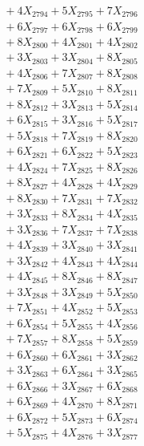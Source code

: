 \documentclass[a4paper,10pt]{article}
\begin{document}
{\begin{align}
&\;  + 4 X_{2794} + 5 X_{2795} + 7 X_{2796} \\[0.3ex]
&\;  + 6 X_{2797} + 6 X_{2798} + 6 X_{2799} \\[0.5ex]\allowbreak
&\;  + 8 X_{2800} + 4 X_{2801} + 4 X_{2802} \\[0.3ex]
&\;  + 3 X_{2803} + 3 X_{2804} + 8 X_{2805} \\[0.3ex]
&\;  + 4 X_{2806} + 7 X_{2807} + 8 X_{2808} \\[0.3ex]
&\;  + 7 X_{2809} + 5 X_{2810} + 8 X_{2811} \\[0.3ex]
&\;  + 8 X_{2812} + 3 X_{2813} + 5 X_{2814} \\[0.3ex]
&\;  + 6 X_{2815} + 3 X_{2816} + 5 X_{2817} \\[0.3ex]
&\;  + 5 X_{2818} + 7 X_{2819} + 8 X_{2820} \\[0.3ex]
&\;  + 6 X_{2821} + 6 X_{2822} + 5 X_{2823} \\[0.3ex]
&\;  + 4 X_{2824} + 7 X_{2825} + 8 X_{2826} \\[0.3ex]
&\;  + 8 X_{2827} + 4 X_{2828} + 4 X_{2829} \\[0.5ex]\allowbreak
&\;  + 8 X_{2830} + 7 X_{2831} + 7 X_{2832} \\[0.3ex]
&\;  + 3 X_{2833} + 8 X_{2834} + 4 X_{2835} \\[0.3ex]
&\;  + 3 X_{2836} + 7 X_{2837} + 7 X_{2838} \\[0.3ex]
&\;  + 4 X_{2839} + 3 X_{2840} + 3 X_{2841} \\[0.3ex]
&\;  + 3 X_{2842} + 4 X_{2843} + 4 X_{2844} \\[0.3ex]
&\;  + 4 X_{2845} + 8 X_{2846} + 8 X_{2847} \\[0.3ex]
&\;  + 3 X_{2848} + 3 X_{2849} + 5 X_{2850} \\[0.3ex]
&\;  + 7 X_{2851} + 4 X_{2852} + 5 X_{2853} \\[0.3ex]
&\;  + 6 X_{2854} + 5 X_{2855} + 4 X_{2856} \\[0.3ex]
&\;  + 7 X_{2857} + 8 X_{2858} + 5 X_{2859} \\[0.5ex]\allowbreak
&\;  + 6 X_{2860} + 6 X_{2861} + 3 X_{2862} \\[0.3ex]
&\;  + 3 X_{2863} + 6 X_{2864} + 3 X_{2865} \\[0.3ex]
&\;  + 6 X_{2866} + 3 X_{2867} + 6 X_{2868} \\[0.3ex]
&\;  + 6 X_{2869} + 4 X_{2870} + 8 X_{2871} \\[0.3ex]
&\;  + 6 X_{2872} + 5 X_{2873} + 6 X_{2874} \\[0.3ex]
&\;  + 5 X_{2875} + 4 X_{2876} + 3 X_{2877} \\[0.3ex]

\end{align}}
\end{document}
